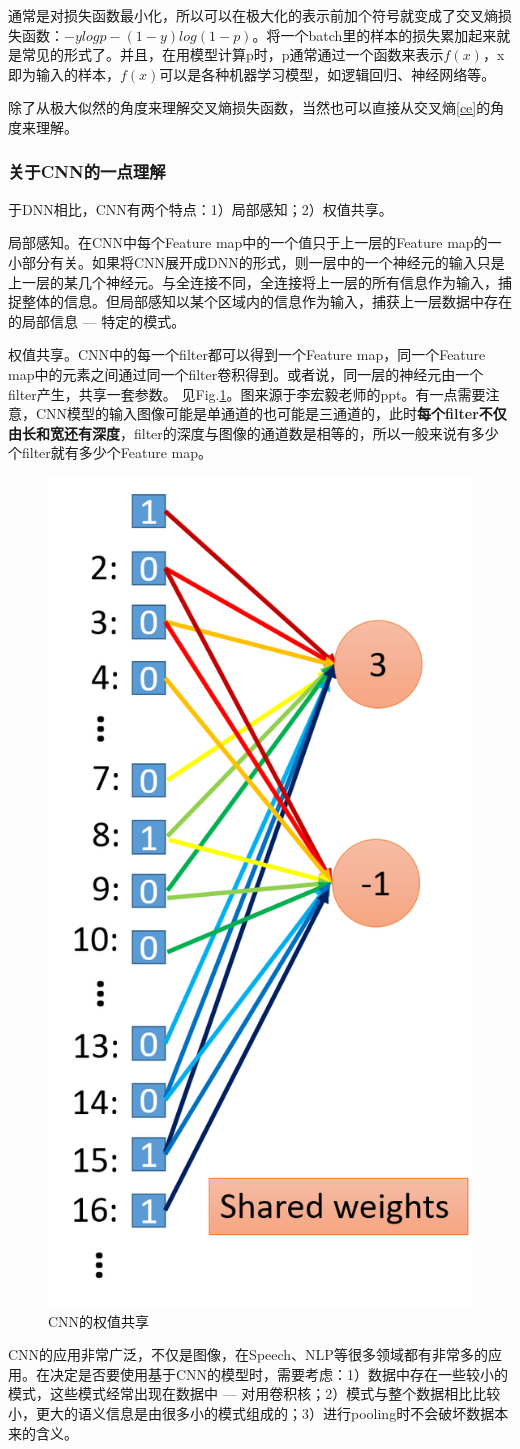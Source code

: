 通常是对损失函数最小化，所以可以在极大化的表示前加个符号就变成了交叉熵损失函数：$- y log p - (1-y) log(1-p)$。将一个batch里的样本的损失累加起来就是常见的形式了。并且，在用模型计算p时，p通常通过一个函数来表示$f(x)$，x即为输入的样本，$f(x)$可以是各种机器学习模型，如逻辑回归、神经网络等。

除了从极大似然的角度来理解交叉熵损失函数，当然也可以直接从交叉熵\ref{ce}的角度来理解。

\subsubsection{关于CNN的一点理解}
于DNN相比，CNN有两个特点：1）局部感知；2）权值共享。

局部感知。在CNN中每个Feature map中的一个值只于上一层的Feature map的一小部分有关。如果将CNN展开成DNN的形式，则一层中的一个神经元的输入只是上一层的某几个神经元。与全连接不同，全连接将上一层的所有信息作为输入，捕捉整体的信息。但局部感知以某个区域内的信息作为输入，捕获上一层数据中存在的局部信息 --- 特定的模式。

权值共享。CNN中的每一个filter都可以得到一个Feature map，同一个Feature map中的元素之间通过同一个filter卷积得到。或者说，同一层的神经元由一个filter产生，共享一套参数。
见Fig.\ref{fig:share_weight}。图来源于李宏毅老师的ppt。有一点需要注意，CNN模型的输入图像可能是单通道的也可能是三通道的，此时\textbf{每个filter不仅由长和宽还有深度}，filter的深度与图像的通道数是相等的，所以一般来说有多少个filter就有多少个Feature map。

\begin{figure}[h]
	\centering
	\includegraphics[width=.3\textwidth]{pics/share_weight.png}
	\caption{CNN的权值共享}
	\label{fig:share_weight}
\end{figure}

CNN的应用非常广泛，不仅是图像，在Speech、NLP等很多领域都有非常多的应用。在决定是否要使用基于CNN的模型时，需要考虑：1）数据中存在一些较小的模式，这些模式经常出现在数据中 --- 对用卷积核；2）模式与整个数据相比比较小，更大的语义信息是由很多小的模式组成的；3）进行pooling时不会破坏数据本来的含义。

